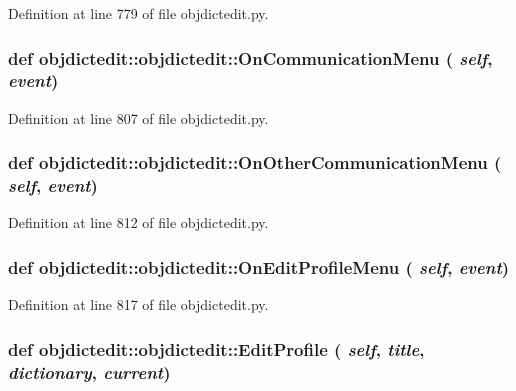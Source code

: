 Definition at line 779 of file objdictedit.py.\hypertarget{classobjdictedit_1_1objdictedit_e1addc8fb2f5922f54e3e7805ed5d33e}{
\subsubsection[OnCommunicationMenu]{\setlength{\rightskip}{0pt plus 5cm}def objdictedit::objdictedit::On\-Communication\-Menu ( {\em self},  {\em event})}}
\label{classobjdictedit_1_1objdictedit_e1addc8fb2f5922f54e3e7805ed5d33e}




Definition at line 807 of file objdictedit.py.\hypertarget{classobjdictedit_1_1objdictedit_01f0b410972b6c480f6eac6448aca0e6}{
\subsubsection[OnOtherCommunicationMenu]{\setlength{\rightskip}{0pt plus 5cm}def objdictedit::objdictedit::On\-Other\-Communication\-Menu ( {\em self},  {\em event})}}
\label{classobjdictedit_1_1objdictedit_01f0b410972b6c480f6eac6448aca0e6}




Definition at line 812 of file objdictedit.py.\hypertarget{classobjdictedit_1_1objdictedit_e807650522769539794ab076713098e2}{
\subsubsection[OnEditProfileMenu]{\setlength{\rightskip}{0pt plus 5cm}def objdictedit::objdictedit::On\-Edit\-Profile\-Menu ( {\em self},  {\em event})}}
\label{classobjdictedit_1_1objdictedit_e807650522769539794ab076713098e2}




Definition at line 817 of file objdictedit.py.\hypertarget{classobjdictedit_1_1objdictedit_0c0a3c1a47120a21ae3d4080c644ea0f}{
\subsubsection[EditProfile]{\setlength{\rightskip}{0pt plus 5cm}def objdictedit::objdictedit::Edit\-Profile ( {\em self},  {\em title},  {\em dictionary},  {\em current})}}
\label{classobjdictedit_1_1objdictedit_0c0a3c1a47120a21ae3d4080c644ea0f}




